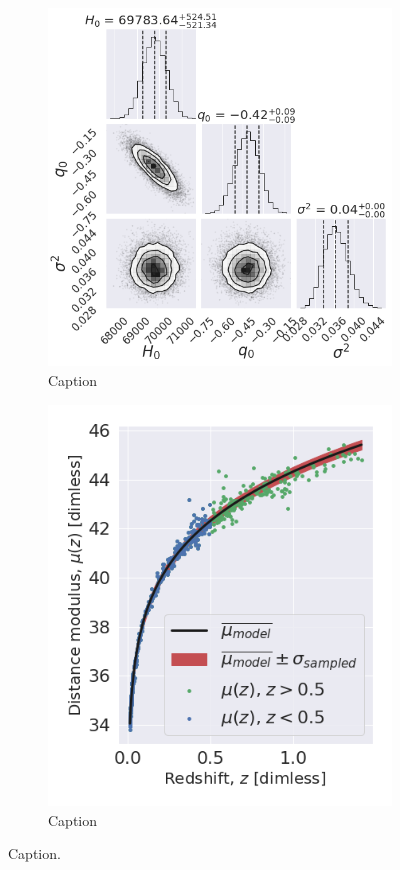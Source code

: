 \documentclass[11pt,a4paper]{article}
\begin{document}
\begin{figure}[H]
    \centering
    \begin{subfigure}{.55\textwidth}
          \centering
          \includegraphics[width=0.9\linewidth]{figures/corner.png}
          \caption{Caption}
          \label{fig:Joint_dist}
    \end{subfigure}%
    \begin{subfigure}{.45\textwidth}
          \centering
          \includegraphics[width=0.9\linewidth]{figures/predictive_plot_mu.png}
          \caption{Caption}
          \label{fig:posterior_pred}
    \end{subfigure}
    \caption{Caption.}
    \label{fig:posterior_task1}
\end{figure}
\end{document}
